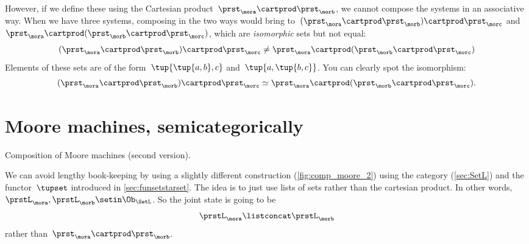 {    However, if we define these using the Cartesian product~$\prst_{\mora} \cartprod \prst_{\morb}$, we cannot compose the systems in an associative way.
    When we have three systems, composing in the two ways would bring to~$(\prst_{\mora} \cartprod \prst_{\morb}) \cartprod \prst_{\morc}$ and~$\prst_{\mora} \cartprod (\prst_{\morb} \cartprod \prst_{\morc})$, which are \emph{isomorphic} sets but not equal:
    \begin{equation}
        \label{eq:assoc-fails1}
        (\prst_{\mora} \cartprod \prst_{\morb}) \cartprod \prst_{\morc} \neq \prst_{\mora} \cartprod (\prst_{\morb} \cartprod \prst_{\morc})
    \end{equation}
    Elements of these sets are of the form~$\tup{\tup{a,b},c}$ and~$\tup{a, \tup{b,c}}$.
    You can clearly spot the isomorphism:
    \begin{equation}
        \label{eq:assoc-fails2}
        (\prst_{\mora} \cartprod \prst_{\morb}) \cartprod \prst_{\morc} \simeq \prst_{\mora} \cartprod (\prst_{\morb} \cartprod \prst_{\morc}).
    \end{equation}

\section{Moore machines, semicategorically}
\label{sec:moore-semicategorically}

    \begin{marginfigure}
        \centering
        \caption{Composition of Moore machines (second version).}
        \label{fig:comp_moore_2}
    \end{marginfigure}

    We can avoid lengthy book-keeping by using a slightly different construction (\cref{fig:comp_moore_2}) using the \SetL category (\cref{sec:SetL}) and the functor~$\tupset$ introduced in \cref{sec:funsetstarset}.
    The idea is to just use lists of sets rather than the cartesian product.
    In other words,~$\prstL_\mora, \prstL_\morb\setin \Ob_{\SetL}$.
    So the joint state is going to be~
    \begin{equation}
        \label{eq:moore-comp-good-joint}
        \prstL_{\mora} \listconcat   \prstL_{\morb}
    \end{equation}
    rather than~$\prst_{\mora} \cartprod \prst_{\morb}$.

}
